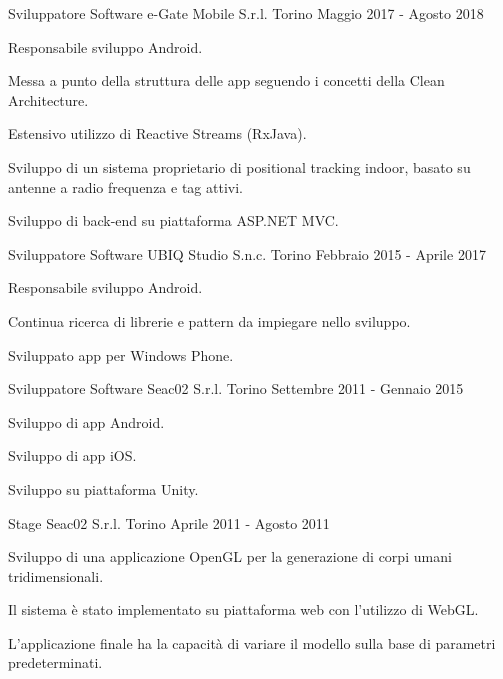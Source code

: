 \begin{cventries}
  \cventry
    {Sviluppatore Software} %
    {e-Gate Mobile S.r.l.} %
    {Torino} %
    {Maggio 2017 - Agosto 2018} %
    {
      \begin{cvitems} %
        \item {Responsabile sviluppo Android.}
        \item {Messa a punto della struttura delle app seguendo i concetti della Clean Architecture.}
        \item {Estensivo utilizzo di Reactive Streams (RxJava).}
        \item {Sviluppo di un sistema proprietario di positional tracking indoor, basato su antenne a radio frequenza e tag attivi.}
        \item {Sviluppo di back-end su piattaforma ASP.NET MVC.}
      \end{cvitems}
    }

  \cventry
    {Sviluppatore Software} %
    {UBIQ Studio S.n.c.} %
    {Torino} %
    {Febbraio 2015 - Aprile 2017} %
    {
      \begin{cvitems} %
        \item {Responsabile sviluppo Android.}
        \item {Continua ricerca di librerie e pattern da impiegare nello sviluppo.}
        \item {Sviluppato app per Windows Phone.}
      \end{cvitems}
    }

  \cventry
    {Sviluppatore Software} %
    {Seac02 S.r.l.} %
    {Torino} %
    {Settembre 2011 - Gennaio 2015} %
    {
      \begin{cvitems} %
        \item {Sviluppo di app Android.}
        \item {Sviluppo di app iOS.}
        \item {Sviluppo su piattaforma Unity.}
      \end{cvitems}
    }

  \cventry
    {Stage} %
    {Seac02 S.r.l.} %
    {Torino} %
    {Aprile 2011 - Agosto 2011} %
    {
      \begin{cvitems} %
        \item {Sviluppo di una applicazione OpenGL per la generazione di corpi umani tridimensionali.}
        \item {Il sistema è stato implementato su piattaforma web con l'utilizzo di WebGL.}
        \item {L'applicazione finale ha la capacità di variare il modello sulla base di parametri predeterminati.}
      \end{cvitems}
    }


\end{cventries}
